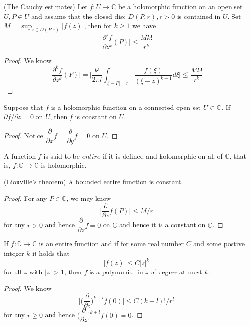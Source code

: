 \documentclass[lang=en, color=blue, ]{elegantbook}
\newcommand{\C}{\mathbb{C}}
\newcommand{\ParZ}{\dfrac{\partial}{\partial z}}
\newcommand{\ParX}{\dfrac{\partial}{\partial x}}
\newcommand{\ParY}{\dfrac{\partial}{\partial y}}
\begin{document}
\begin{theorem}
    (The Cauchy estimates) Let $f:U\to\C$ be a holomorphic function on an open set $U,P\in U$ and assume that the closed disc $\overline{D}(P,r),r>0$ is contained in $U$. Set $M = \sup_{z\in \overline{D}(P,r)}|f(z)|$, then for $k\geq 1$ we have
    \[
    \Big|\dfrac{\partial^k f}{\partial z^k}(P) \Big| \leq \dfrac{Mk!}{r^k}
    \]
\end{theorem}
\begin{proof}\par
    We know
    \[
    \Big|\dfrac{\partial^k f}{\partial z^k}(P) \Big| = \Big|\dfrac{k!}{2\pi i}\int_{|\xi-P| = r}\dfrac{f(\xi)}{(\xi-z)^{k+1}}d\xi \Big| \leq \dfrac{Mk!}{r^k} 
    \]
\end{proof}

\begin{lemma}
    Suppose that $f$ is a holomorphic function on a connected open set $U\subset\C$. If $\partial f/\partial z = 0$ on $U$, then $f$ is constant on $U$.
\end{lemma}
\begin{proof}
    Notice $\ParX f = \ParY f =0$ on $U$.
\end{proof}

\begin{definition}
    A function $f$ is said to be $entire$ if it is defined and holomorphic on all of $\C$, that is, $f:\C\to\C$ is holomorphic.
\end{definition}

\begin{theorem}
    (Liouville's theorem) A bounded entire function is constant.
\end{theorem}
\begin{proof}
    For any $P\in\C$, we may know
    \[
    \Big|\ParZ f(P)\Big| \leq M/r
    \]
    for any $r>0$ and hence $\ParZ f = 0$ on $\C$ and hence it is a constant on $\C$.
\end{proof}

\begin{theorem}
    If $f:\C\to\C$ is an entire function and if for some real number $C$ and some postive integer $k$ it holds that
    \[|f(z)|\leq C|z|^k\]
    for all $z$ with $|z|>1$, then $f$ is a polynomial in $z$ of degree at most $k$.
\end{theorem}
\begin{proof}
    We know
    \[
    \Big|\Big(\ParZ\Big)^{k+l} f(0)\Big| \leq C(k+l)!/r^l 
    \]
    for any $r\geq 0$ and hence $\Big(\ParZ\Big)^{k+l} f(0) = 0$.
\end{proof}
\end{document}
